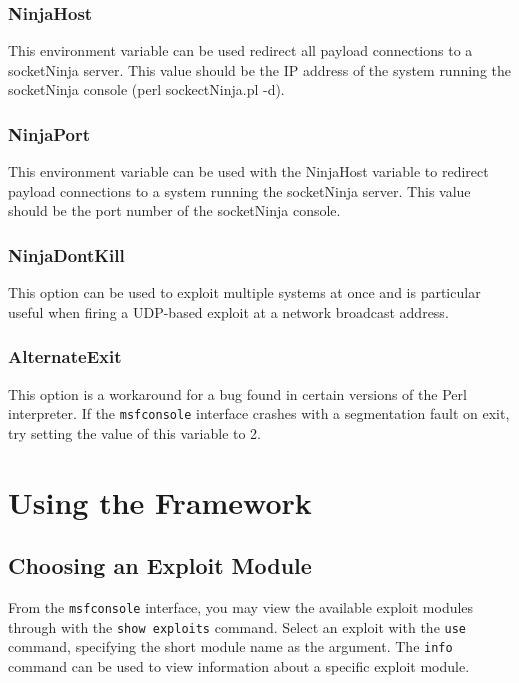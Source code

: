 \documentclass{report}
\begin{document}
	\subsection{NinjaHost}
\par
This environment variable can be used redirect all payload connections to a
socketNinja server. This value should be the IP address of the system running
the socketNinja console (perl sockectNinja.pl -d).  

	\subsection{NinjaPort}
\par
This environment variable can be used with the NinjaHost variable to redirect
payload connections to a system running the socketNinja server. This value
should be the port number of the socketNinja console. 

	\subsection{NinjaDontKill}
\par
This option can be used to exploit multiple systems at once and is particular
useful when firing a UDP-based exploit at a network broadcast address. 

	\subsection{AlternateExit}
\par
This option is a workaround for a bug found in certain versions of the Perl
interpreter. If the \texttt{msfconsole} interface crashes with a segmentation fault on
exit, try setting the value of this variable to 2. 
	
\pagebreak

\chapter{Using the Framework}


	\section{Choosing an Exploit Module}
\par
From the \texttt{msfconsole} interface, you may view the available exploit modules
through with the \texttt{show exploits} command. Select an exploit with the
\texttt{use} command, specifying the short module name as the argument. The
\texttt{info} command can be used to view information about a specific exploit module. 
\end{document}
